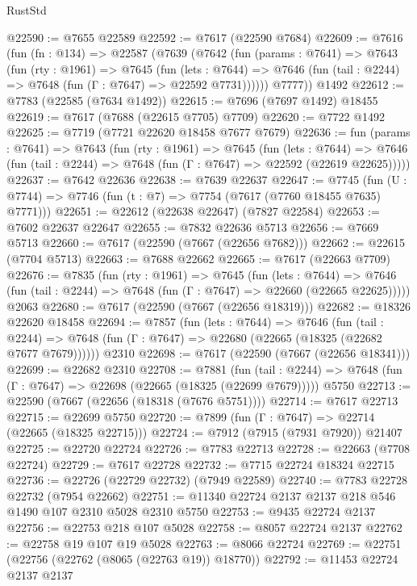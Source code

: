 \begin{lexlean}{RustStd}
\begin{coremodule}
@22590 := @7655 @22589
@22592 := @7617 (@22590 @7684)
@22609 := @7616
    (fun (fn : @134) =>
    @22587
      (@7639
        (@7642
          (fun (params : @7641) =>
          @7643
            (fun (rty : @1961) =>
            @7645
              (fun (lets : @7644) =>
              @7646 (fun (tail : @2244) => @7648 (fun (Γ : @7647) => @22592 @7731))))))
        @7777))
    @1492
@22612 := @7783 (@22585 (@7634 @1492))
@22615 := @7696 (@7697 @1492) @18455
@22619 := @7617 (@7688 (@22615 @7705) @7709)
@22620 := @7722 @1492
@22625 := @7719 (@7721 @22620 @18458 @7677 @7679)
@22636 := fun (params : @7641) =>
  @7643
    (fun (rty : @1961) =>
    @7645
      (fun (lets : @7644) =>
      @7646 (fun (tail : @2244) => @7648 (fun (Γ : @7647) => @22592 (@22619 @22625)))))
@22637 := @7642 @22636
@22638 := @7639 @22637
@22647 := @7745
    (fun (U : @7744) => @7746 (fun (t : @7) => @7754 (@7617 (@7760 @18455 @7635) @7771)))
@22651 := @22612 (@22638 @22647) (@7827 @22584)
@22653 := @7602 @22637 @22647
@22655 := @7832 @22636 @5713
@22656 := @7669 @5713
@22660 := @7617 (@22590 (@7667 (@22656 @7682)))
@22662 := @22615 (@7704 @5713)
@22663 := @7688 @22662
@22665 := @7617 (@22663 @7709)
@22676 := @7835
    (fun (rty : @1961) =>
    @7645
      (fun (lets : @7644) =>
      @7646 (fun (tail : @2244) => @7648 (fun (Γ : @7647) => @22660 (@22665 @22625)))))
    @2063
@22680 := @7617 (@22590 (@7667 (@22656 @18319)))
@22682 := @18326 @22620 @18458
@22694 := @7857
    (fun (lets : @7644) =>
    @7646
      (fun (tail : @2244) =>
      @7648 (fun (Γ : @7647) => @22680 (@22665 (@18325 (@22682 @7677 @7679))))))
    @2310
@22698 := @7617 (@22590 (@7667 (@22656 @18341)))
@22699 := @22682 @2310
@22708 := @7881
    (fun (tail : @2244) => @7648 (fun (Γ : @7647) => @22698 (@22665 (@18325 (@22699 @7679)))))
    @5750
@22713 := @22590 (@7667 (@22656 (@18318 (@7676 @5751))))
@22714 := @7617 @22713
@22715 := @22699 @5750
@22720 := @7899 (fun (Γ : @7647) => @22714 (@22665 (@18325 @22715)))
@22724 := @7912 (@7915 (@7931 @7920)) @21407
@22725 := @22720 @22724
@22726 := @7783 @22713
@22728 := @22663 (@7708 @22724)
@22729 := @7617 @22728
@22732 := @7715 @22724 @18324 @22715
@22736 := @22726 (@22729 @22732) (@7949 @22589)
@22740 := @7783 @22728 @22732 (@7954 @22662)
@22751 := @11340 @22724 @2137 @2137 @218 @546 @1490 @107 @2310 @5028 @2310 @5750
@22753 := @9435 @22724 @2137
@22756 := @22753 @218 @107 @5028
@22758 := @8057 @22724 @2137
@22762 := @22758 @19 @107 @19 @5028
@22763 := @8066 @22724
@22769 := @22751 (@22756 (@22762 (@8065 (@22763 @19)) @18770))
@22792 := @11453
    @22724
    @2137
    @2137

\end{coremodule}
\end{lexlean}
